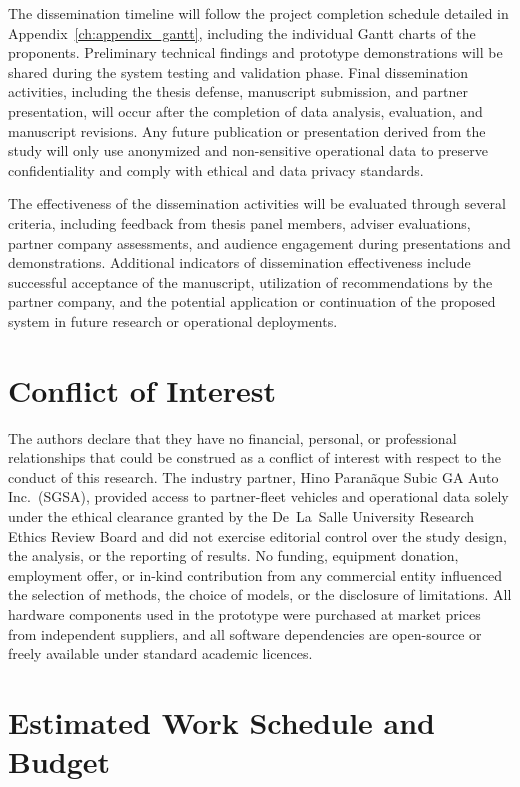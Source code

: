 The dissemination timeline will follow the project completion schedule detailed in Appendix~\ref{ch:appendix_gantt}, including the individual Gantt charts of the proponents. Preliminary technical findings and prototype demonstrations will be shared during the system testing and validation phase. Final dissemination activities, including the thesis defense, manuscript submission, and partner presentation, will occur after the completion of data analysis, evaluation, and manuscript revisions. Any future publication or presentation derived from the study will only use anonymized and non-sensitive operational data to preserve confidentiality and comply with ethical and data privacy standards.

The effectiveness of the dissemination activities will be evaluated through several criteria, including feedback from thesis panel members, adviser evaluations, partner company assessments, and audience engagement during presentations and demonstrations. Additional indicators of dissemination effectiveness include successful acceptance of the manuscript, utilization of recommendations by the partner company, and the potential application or continuation of the proposed system in future research or operational deployments.

\section{Conflict of Interest}

The authors declare that they have no financial, personal, or professional relationships that could be construed as a conflict of interest with respect to the conduct of this research. The industry partner, Hino Paran\~{a}que Subic GA Auto Inc.\ (SGSA), provided access to partner-fleet vehicles and operational data solely under the ethical clearance granted by the De~La~Salle University Research Ethics Review Board and did not exercise editorial control over the study design, the analysis, or the reporting of results. No funding, equipment donation, employment offer, or in-kind contribution from any commercial entity influenced the selection of methods, the choice of models, or the disclosure of limitations. All hardware components used in the prototype were purchased at market prices from independent suppliers, and all software dependencies are open-source or freely available under standard academic licences.


\section{Estimated Work Schedule and Budget}

